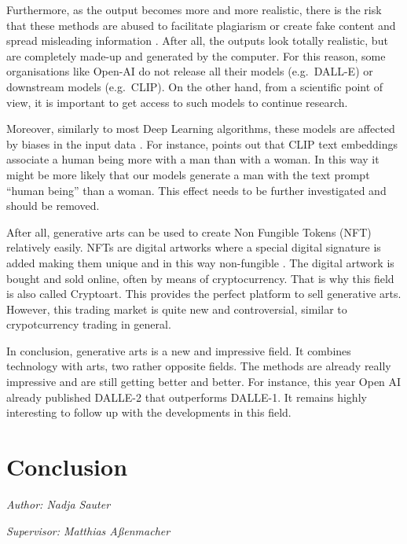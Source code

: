 \documentclass[
]{krantz}
\begin{document}
Furthermore, as the output becomes more and more realistic, there is the risk that these methods are abused to facilitate plagiarism or create fake content and spread misleading information \citep{misconduct}. After all, the outputs look totally realistic, but are completely made-up and generated by the computer. For this reason, some organisations like Open-AI do not release all their models (e.g.~DALL-E) or downstream models (e.g.~CLIP). On the other hand, from a scientific point of view, it is important to get access to such models to continue research.

Moreover, similarly to most Deep Learning algorithms, these models are affected by biases in the input data \citep{bias_ML}. For instance, \citet{bias} points out that CLIP text embeddings associate a human being more with a man than with a woman. In this way it might be more likely that our models generate a man with the text prompt ``human being'' than a woman. This effect needs to be further investigated and should be removed.

After all, generative arts can be used to create Non Fungible Tokens (NFT) relatively easily. NFTs are digital artworks where a special digital signature is added making them unique and in this way non-fungible \citep{NFT}. The digital artwork is bought and sold online, often by means of cryptocurrency. That is why this field is also called Cryptoart. This provides the perfect platform to sell generative arts. However, this trading market is quite new and controversial, similar to crypotcurrency trading in general.

In conclusion, generative arts is a new and impressive field. It combines technology with arts, two rather opposite fields. The methods are already really impressive and are still getting better and better. For instance, this year Open AI already published DALLE-2 \citep{DALLE2} that outperforms DALLE-1. It remains highly interesting to follow up with the developments in this field.

\hypertarget{conclusion-1}{%
\chapter{Conclusion}\label{conclusion-1}}

\emph{Author: Nadja Sauter}

\emph{Supervisor: Matthias Aßenmacher}
\end{document}
